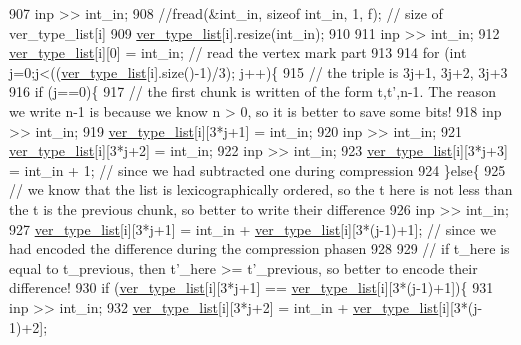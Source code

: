 \begin{DoxyCode}
907     inp >> int\_in;
908     \textcolor{comment}{//fread(&int\_in, sizeof int\_in, 1, f); // size of ver\_type\_list[i]}
909     \hyperlink{classmarked__graph__compressed_af2e3e55223d436628a02758dfae88493}{ver\_type\_list}[i].resize(int\_in);
910 
911     inp >> int\_in;
912     \hyperlink{classmarked__graph__compressed_af2e3e55223d436628a02758dfae88493}{ver\_type\_list}[i][0] = int\_in; \textcolor{comment}{// read the vertex mark part}
913 
914     \textcolor{keywordflow}{for} (\textcolor{keywordtype}{int} j=0;j<((\hyperlink{classmarked__graph__compressed_af2e3e55223d436628a02758dfae88493}{ver\_type\_list}[i].size()-1)/3); j++)\{
915       \textcolor{comment}{// the triple is 3j+1, 3j+2, 3j+3}
916       \textcolor{keywordflow}{if} (j==0)\{
917         \textcolor{comment}{// the first chunk is written of the form t,t',n-1. The reason we write n-1 is because we know n >
       0, so it is better to save some bits!}
918         inp >> int\_in;
919         \hyperlink{classmarked__graph__compressed_af2e3e55223d436628a02758dfae88493}{ver\_type\_list}[i][3*j+1] = int\_in;
920         inp >> int\_in;
921         \hyperlink{classmarked__graph__compressed_af2e3e55223d436628a02758dfae88493}{ver\_type\_list}[i][3*j+2] = int\_in;
922         inp >> int\_in;
923         \hyperlink{classmarked__graph__compressed_af2e3e55223d436628a02758dfae88493}{ver\_type\_list}[i][3*j+3] = int\_in + 1; \textcolor{comment}{// since we had subtracted one during
       compression}
924       \}\textcolor{keywordflow}{else}\{
925         \textcolor{comment}{// we know that the list is lexicographically ordered, so the t here is not less than the t is the
       previous chunk, so better to write their difference}
926         inp >> int\_in;
927         \hyperlink{classmarked__graph__compressed_af2e3e55223d436628a02758dfae88493}{ver\_type\_list}[i][3*j+1] = int\_in + \hyperlink{classmarked__graph__compressed_af2e3e55223d436628a02758dfae88493}{ver\_type\_list}[i][3*(j-1)+1]; \textcolor{comment}{// since
       we had encoded the difference during the compression phasen}
928 
929         \textcolor{comment}{// if t\_here is equal to t\_previous, then t'\_here >= t'\_previous, so better to encode their
       difference!}
930         \textcolor{keywordflow}{if} (\hyperlink{classmarked__graph__compressed_af2e3e55223d436628a02758dfae88493}{ver\_type\_list}[i][3*j+1] == \hyperlink{classmarked__graph__compressed_af2e3e55223d436628a02758dfae88493}{ver\_type\_list}[i][3*(j-1)+1])\{
931           inp >> int\_in;
932           \hyperlink{classmarked__graph__compressed_af2e3e55223d436628a02758dfae88493}{ver\_type\_list}[i][3*j+2] = int\_in + \hyperlink{classmarked__graph__compressed_af2e3e55223d436628a02758dfae88493}{ver\_type\_list}[i][3*(j-1)+2];

\end{DoxyCode}
